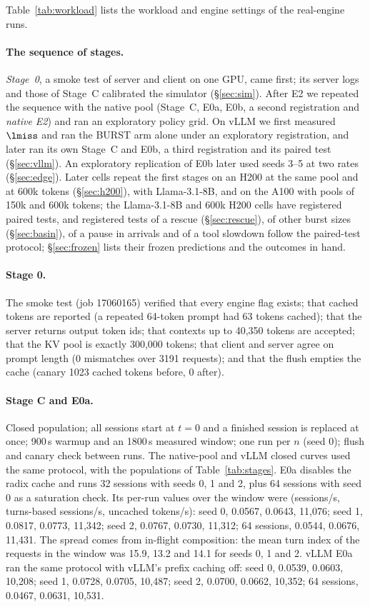 Table~\ref{tab:workload} lists the workload and engine settings of the real-engine runs.

\paragraph{The sequence of stages.} \emph{Stage~0}, a smoke test of server and client on one GPU, came first; its server logs and those of Stage~C calibrated the simulator (\S\ref{sec:sim}). After E2 we repeated the sequence with the native pool (Stage~C, E0a, E0b, a second registration and \emph{native E2}) and ran an exploratory policy grid. On vLLM we first measured $\lmiss$ and ran the BURST arm alone under an exploratory registration, and later ran its own Stage~C and E0b, a third registration and its paired test (\S\ref{sec:vllm}). An exploratory replication of E0b later used seeds 3--5 at two rates (\S\ref{sec:edge}). Later cells repeat the first stages on an H200 at the same pool and at 600k tokens (\S\ref{sec:h200}), with Llama-3.1-8B, and on the A100 with pools of 150k and 600k tokens; the Llama-3.1-8B and 600k H200 cells have registered paired tests, and registered tests of a rescue (\S\ref{sec:rescue}), of other burst sizes (\S\ref{sec:basin}), of a pause in arrivals and of a tool slowdown follow the paired-test protocol; \S\ref{sec:frozen} lists their frozen predictions and the outcomes in hand.

\paragraph{Stage 0.} The smoke test (job 17060165) verified that every engine flag exists; that cached tokens are reported (a repeated 64-token prompt had 63 tokens cached); that the server returns output token ids; that contexts up to 40,350 tokens are accepted; that the KV pool is exactly 300,000 tokens; that client and server agree on prompt length (0 mismatches over 3191 requests); and that the flush empties the cache (canary 1023 cached tokens before, 0 after).

\paragraph{Stage C and E0a.} Closed population; all sessions start at $t=0$ and a finished session is replaced at once; 900\,s warmup and an 1800\,s measured window; one run per $n$ (seed 0); flush and canary check between runs. The native-pool and vLLM closed curves used the same protocol, with the populations of Table~\ref{tab:stages}. E0a disables the radix cache and runs 32 sessions with seeds 0, 1 and 2, plus 64 sessions with seed 0 as a saturation check. Its per-run values over the window were (sessions/s, turns-based sessions/s, uncached tokens/s): seed 0, 0.0567, 0.0643, 11,076; seed 1, 0.0817, 0.0773, 11,342; seed 2, 0.0767, 0.0730, 11,312; 64 sessions, 0.0544, 0.0676, 11,431. The spread comes from in-flight composition: the mean turn index of the requests in the window was 15.9, 13.2 and 14.1 for seeds 0, 1 and 2. vLLM E0a ran the same protocol with vLLM's prefix caching off: seed 0, 0.0539, 0.0603, 10,208; seed 1, 0.0728, 0.0705, 10,487; seed 2, 0.0700, 0.0662, 10,352; 64 sessions, 0.0467, 0.0631, 10,531.

